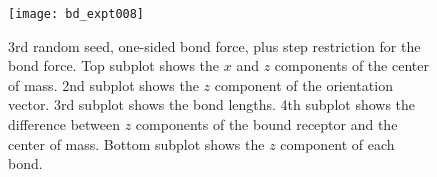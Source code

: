 \documentclass{article}
\begin{document}
\begin{figure}
  \centering
  \texttt{[image: bd\_expt008]}
  \caption{3rd random seed, one-sided bond force, plus step
    restriction for the bond force. Top subplot shows the $x$ and $z$
    components of the center of mass. 2nd subplot shows the $z$
    component of the orientation vector. 3rd subplot shows the bond
    lengths. 4th subplot shows the difference between $z$ components
    of the bound receptor and the center of mass. Bottom subplot shows
    the $z$ component of each bond.}
  \label{fig:fig9}
\end{figure}



\end{document}
